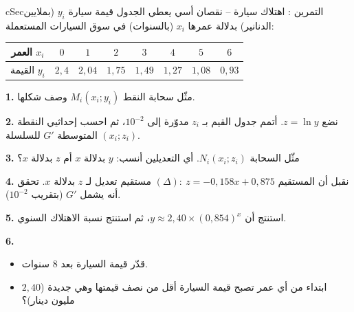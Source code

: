 \documentclass[12pt,a4paper]{article}
\newenvironment{BOX}[2]{\begin{otherlanguage}{english}\begin{arbox}{#1}{#2}}{\end{arbox}\end{otherlanguage}}
\newcounter{exo}
\newenvironment{tamrin}[1]{\stepcounter{exo}\begin{BOX}{cSec}{التمرين \theexo: #1}}{\end{BOX}}
\newenvironment{LTR}{\begin{otherlanguage}{english}}{\end{otherlanguage}}
\newcommand{\ar}[1]{\foreignlanguage{arabic}{#1}}
\newenvironment{sq}{\begin{itemize}[leftmargin=2.4em,itemsep=3pt]}{\end{itemize}}
\newcommand{\qa}{\item[(أ)]}\newcommand{\qb}{\item[(ب)]}\newcommand{\qc}{\item[(جـ)]}\newcommand{\qd}{\item[(د)]}\newcommand{\qe}{\item[(هـ)]}
\newcommand{\QQ}[1]{\par\smallskip\textbf{#1.} }
\begin{document}
\begin{tamrin}{اهتلاك سيارة -- نقصان أسي}
يعطي الجدول قيمة سيارة $y_i$ (بملايين الدنانير) بدلالة عمرها $x_i$ (بالسنوات) في سوق السيارات المستعملة:
\begin{center}\begin{LTR}\renewcommand{\arraystretch}{1.35}\small
\begin{tabular}{|c|c|c|c|c|c|c|c|}\hline
\rowcolor{cSec!12}\ar{العمر} $x_i$ & $0$ & $1$ & $2$ & $3$ & $4$ & $5$ & $6$\\\hline
\ar{القيمة} $y_i$ & $2,4$ & $2,04$ & $1,75$ & $1,49$ & $1,27$ & $1,08$ & $0,93$\\\hline
\end{tabular}\end{LTR}\end{center}
\QQ{1} مثّل سحابة النقط $M_i(x_i;y_i)$ وصف شكلها.
\QQ{2} نضع $z=\ln y$. أتمم جدول القيم بـ $z_i$ مدوّرة إلى $10^{-2}$، ثم احسب إحداثيي النقطة المتوسطة $G'$ للسلسلة $(x_i;z_i)$.
\QQ{3} مثّل السحابة $N_i(x_i;z_i)$. أي التعديلين أنسب: $y$ بدلالة $x$ أم $z$ بدلالة $x$؟
\QQ{4} نقبل أن المستقيم $(\Delta):\ z=-0{,}158x+0{,}875$ مستقيم تعديل لـ $z$ بدلالة $x$. تحقق أنه يشمل $G'$ (بتقريب $10^{-2}$).
\QQ{5} استنتج أن $y\approx2{,}40\times(0{,}854)^{x}$، ثم استنتج نسبة الاهتلاك السنوي.
\QQ{6}
\begin{sq}
\qa قدّر قيمة السيارة بعد $8$ سنوات.
\qb ابتداء من أي عمر تصبح قيمة السيارة أقل من نصف قيمتها وهي جديدة ($2{,}40$ مليون دينار)؟
\end{sq}
\end{tamrin}
\end{document}
